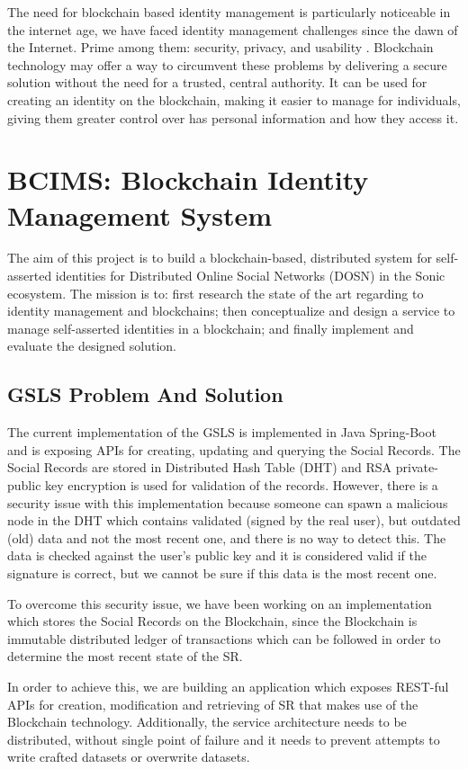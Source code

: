 The need for blockchain based identity management is particularly noticeable in the internet age, we have faced identity management challenges since the dawn of the Internet. Prime among them: security, privacy, and usability \cite{Blockchain}.
Blockchain technology may offer a way to circumvent these problems by delivering a secure solution without the need for a trusted, central authority. It can be used for creating an identity on the blockchain, making it easier to manage for individuals, giving them greater control over has personal information and how they access it.

\section{BCIMS: Blockchain Identity Management System}
The aim of this project is to build a blockchain-based, distributed system for self-asserted identities for Distributed Online Social Networks (DOSN) in the Sonic ecosystem. The mission is to:  first research the state of the art regarding to identity management and blockchains; then conceptualize and design a service to manage self-asserted identities in a blockchain; and finally implement and evaluate the designed solution. 

\subsection{GSLS Problem And Solution}
The current implementation of the GSLS is implemented in Java Spring-Boot and is exposing APIs for creating, updating and  querying the Social Records. The Social Records are stored in  Distributed Hash Table (DHT) and RSA private-public key encryption is used for validation of the records. However, there is a security issue with this implementation because someone can spawn a malicious node in the DHT which contains validated (signed by the real user), but outdated (old) data and not the most recent one, and there is no way to detect this. The data is checked against the user’s public key and it is considered valid if the signature is correct, but we cannot be sure if this data is the most recent one.

To overcome this security issue, we have been working on an implementation which stores the Social Records on the Blockchain, since the Blockchain is immutable distributed ledger of transactions which can be followed in order to determine the most recent state of the SR.

In order to achieve this, we are building an application which exposes REST-ful APIs for creation, modification and retrieving of SR that makes use of the Blockchain technology. Additionally, the service architecture needs to be distributed, without single point of failure and it needs to prevent attempts to write crafted datasets or overwrite datasets.

